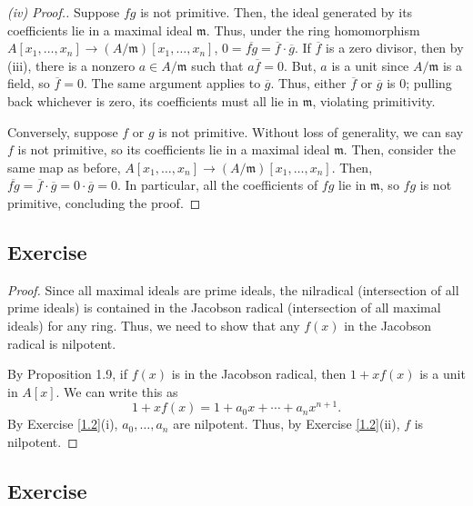\begin{proof}[(iv) Proof.]
Suppose $fg$ is not primitive. Then, the ideal generated by its coefficients lie in a maximal ideal $\mathfrak{m}$.
Thus, under the ring homomorphism $A[x_1,\ldots,x_n] \to (A/\mathfrak{m})[x_1,\ldots,x_n]$, $0 = \overline{fg} = \overline{f}\cdot\overline{g}$.
If $\overline{f}$ is a zero divisor, then by (iii), there is a nonzero $a \in A/\mathfrak{m}$ such that
$a\overline{f} = 0$. But, $a$ is a unit since $A/\mathfrak{m}$ is a field, so $\overline{f}=0$. The same argument applies
to $\overline{g}$. Thus, either $\overline{f}$ or $\overline{g}$ is $0$; pulling back whichever is zero, its coefficients must
all lie in $\mathfrak{m}$, violating primitivity.

Conversely, suppose $f$ or $g$ is not primitive. Without loss of generality, we can say $f$ is not primitive, so its coefficients lie in
a maximal ideal $\mathfrak{m}$. Then, consider the same map as before, $A[x_1,\ldots,x_n] \to (A/\mathfrak{m})[x_1,\ldots,x_n]$. Then,
$\overline{fg} = \overline{f}\cdot\overline{g} = 0 \cdot \overline{g} = 0$. In particular, all the coefficients of $fg$ lie in $\mathfrak{m}$, 
so $fg$ is not primitive, concluding the proof.
\end{proof}

\subsection{Exercise}\label{1.4}

\begin{proof}
Since all maximal ideals are prime ideals, the nilradical (intersection of all prime ideals) is contained in the Jacobson radical 
(intersection of all maximal ideals) for any ring. Thus, we need to show that any $f(x)$ in the Jacobson radical is nilpotent.

By Proposition 1.9, if $f(x)$ is in the Jacobson radical, then $1 + xf(x)$ is a unit in $A[x]$. We can write this as 
$$1 + xf(x) = 1 + a_0x + \cdots + a_nx^{n+1}.$$
By Exercise \ref{1.2}(i), $a_0,\ldots,a_n$ are nilpotent. Thus, by Exercise \ref{1.2}(ii), $f$ is nilpotent.
\end{proof}

\subsection{Exercise}\label{1.5}

